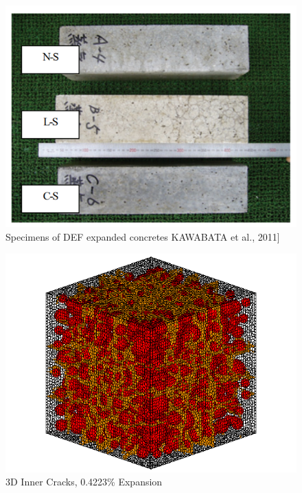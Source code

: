   \begin{figure}[ht!]
  \centering
  \includegraphics[width=.8\linewidth]{Reference/DEFcrack.png}
    \caption{Specimens of DEF expanded concretes KAWABATA et al., 2011]}
    \label{DEFcrack}
  \end{figure}

  \begin{figure}[ht!]
  \centering
  \includegraphics[width=.8\linewidth]{Files/exp_3D/DEF/A30X0C_3_c.png}
    \caption{3D Inner Cracks, 0.4223\% Expansion}
    \label{DEFcraaaack}
  \end{figure}


